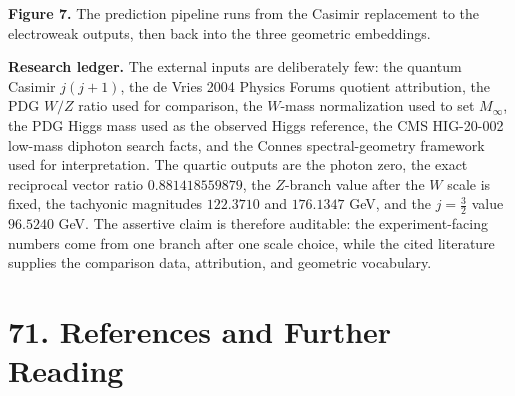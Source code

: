 \documentclass[11pt]{article}
\newcommand{\Lspin}{\Lambda_j}
\newcommand{\hb}{\hbar}
\begin{document}
\begin{center}

\textbf{Figure 7.} The prediction pipeline runs from the Casimir replacement to the electroweak outputs, then back into the three geometric embeddings.
\end{center}


\textbf{Research ledger.}
The external inputs are deliberately few: the quantum Casimir \(j(j+1)\), the de Vries 2004 Physics Forums quotient attribution, the PDG \(W/Z\) ratio used for comparison, the \(W\)-mass normalization used to set \(M_\infty\), the PDG Higgs mass used as the observed Higgs reference, the CMS HIG-20-002 low-mass diphoton search facts, and the Connes spectral-geometry framework used for interpretation. The quartic outputs are the photon zero, the exact reciprocal vector ratio \(0.881418559879\), the \(Z\)-branch value after the \(W\) scale is fixed, the tachyonic magnitudes \(122.3710\) and \(176.1347\) GeV, and the \(j=\frac32\) value \(96.5240\) GeV. The assertive claim is therefore auditable: the experiment-facing numbers come from one branch after one scale choice, while the cited literature supplies the comparison data, attribution, and geometric vocabulary.


\section*{71. References and Further Reading}
\end{document}
